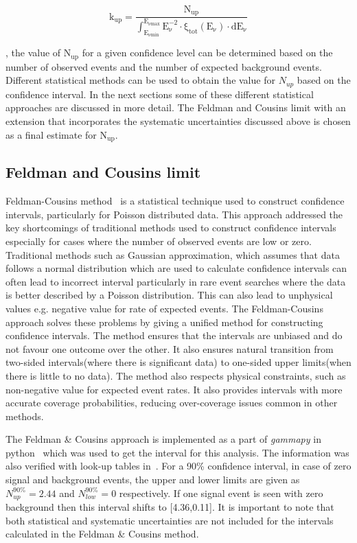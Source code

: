 \begin{equation}
  \label{eq:integ_lim}
  \mathrm{k_{up} = \frac{N_{up}}{\int_{E_{\nu min}}^{E_{\nu max}} E_{\nu}^{-2} \cdot \xi_{tot}(E_{\nu}) \cdot dE_{\nu}}}
\end{equation}

, the value of $\mathrm{N_{up}}$ for a given confidence level can be determined based on the number of observed events and the number of expected background events. Different statistical methods can be used to obtain the value for $N_{up}$ based on the confidence interval. In the next sections some of these different statistical approaches are discussed in more detail. The Feldman and Cousins limit with an extension that incorporates the systematic uncertainties discussed above is chosen as a final estimate for $\mathrm{N_{up}}$.

\subsection{Feldman and Cousins limit}
\label{subsec:FandC}
Feldman-Cousins method~\cite{Feldman:1997qc} is a statistical technique used to construct confidence intervals, particularly for Poisson distributed data. This approach addressed the key shortcomings of traditional methods used to construct confidence intervals especially for cases where the number of observed events are low or zero. Traditional methods such as Gaussian approximation, which assumes that data follows a normal distribution which are used to calculate confidence intervals can often lead to incorrect interval particularly in rare event searches where the data is better described by a Poisson distribution. This can also lead to unphysical values e.g. negative value for rate of expected events. The Feldman-Cousins approach solves these problems by giving a unified method for constructing confidence intervals. The method ensures that the intervals are unbiased and do not favour one outcome over the other. It also ensures natural transition from two-sided intervals(where there is significant data) to one-sided upper limits(when there is little to no data). The method also respects physical constraints, such as non-negative value for expected event rates. It also provides intervals with more accurate coverage probabilities, reducing over-coverage issues common in other methods. 

The Feldman \& Cousins approach is implemented as a part of \textit{gammapy} in python~\cite{Gammapy:2023gvb} which was used  to get the interval for this analysis. The information was also verified with look-up tables in~\cite{Feldman:1997qc}. For a 90\% confidence interval, in case of zero signal and background events, the upper and lower limits are given as $N^{90\%}_{up} = 2.44$ and $N^{90\%}_{low} = 0$ respectively. If one signal event is seen with zero background then this interval shifts to [4.36,0.11]. It is important to note that both statistical and systematic uncertainties are not included for the intervals calculated in the Feldman \& Cousins method. 

